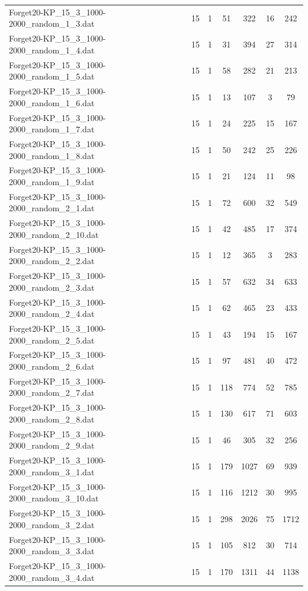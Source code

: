 \begin{table}[!ht]
\begin{tabular}{lcccccc}
Forget20-KP\_15\_3\_1000-2000\_random\_1\_3.dat & 15 & 1 & 51 & 322 & 16 & 242 \\
Forget20-KP\_15\_3\_1000-2000\_random\_1\_4.dat & 15 & 1 & 31 & 394 & 27 & 314 \\
Forget20-KP\_15\_3\_1000-2000\_random\_1\_5.dat & 15 & 1 & 58 & 282 & 21 & 213 \\
Forget20-KP\_15\_3\_1000-2000\_random\_1\_6.dat & 15 & 1 & 13 & 107 & 3 & 79 \\
Forget20-KP\_15\_3\_1000-2000\_random\_1\_7.dat & 15 & 1 & 24 & 225 & 15 & 167 \\
Forget20-KP\_15\_3\_1000-2000\_random\_1\_8.dat & 15 & 1 & 50 & 242 & 25 & 226 \\
Forget20-KP\_15\_3\_1000-2000\_random\_1\_9.dat & 15 & 1 & 21 & 124 & 11 & 98 \\
Forget20-KP\_15\_3\_1000-2000\_random\_2\_1.dat & 15 & 1 & 72 & 600 & 32 & 549 \\
Forget20-KP\_15\_3\_1000-2000\_random\_2\_10.dat & 15 & 1 & 42 & 485 & 17 & 374 \\
Forget20-KP\_15\_3\_1000-2000\_random\_2\_2.dat & 15 & 1 & 12 & 365 & 3 & 283 \\
Forget20-KP\_15\_3\_1000-2000\_random\_2\_3.dat & 15 & 1 & 57 & 632 & 34 & 633 \\
Forget20-KP\_15\_3\_1000-2000\_random\_2\_4.dat & 15 & 1 & 62 & 465 & 23 & 433 \\
Forget20-KP\_15\_3\_1000-2000\_random\_2\_5.dat & 15 & 1 & 43 & 194 & 15 & 167 \\
Forget20-KP\_15\_3\_1000-2000\_random\_2\_6.dat & 15 & 1 & 97 & 481 & 40 & 472 \\
Forget20-KP\_15\_3\_1000-2000\_random\_2\_7.dat & 15 & 1 & 118 & 774 & 52 & 785 \\
Forget20-KP\_15\_3\_1000-2000\_random\_2\_8.dat & 15 & 1 & 130 & 617 & 71 & 603 \\
Forget20-KP\_15\_3\_1000-2000\_random\_2\_9.dat & 15 & 1 & 46 & 305 & 32 & 256 \\
Forget20-KP\_15\_3\_1000-2000\_random\_3\_1.dat & 15 & 1 & 179 & 1027 & 69 & 939 \\
Forget20-KP\_15\_3\_1000-2000\_random\_3\_10.dat & 15 & 1 & 116 & 1212 & 30 & 995 \\
Forget20-KP\_15\_3\_1000-2000\_random\_3\_2.dat & 15 & 1 & 298 & 2026 & 75 & 1712 \\
Forget20-KP\_15\_3\_1000-2000\_random\_3\_3.dat & 15 & 1 & 105 & 812 & 30 & 714 \\
Forget20-KP\_15\_3\_1000-2000\_random\_3\_4.dat & 15 & 1 & 170 & 1311 & 44 & 1138 \\

\end{tabular}
\end{table}
